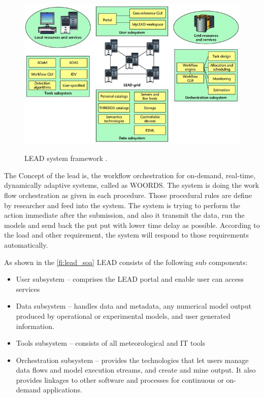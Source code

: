 \begin{figure}[htp]
    \centering
    \includegraphics[width=1.0\textwidth]{lead/LEAD-system-framework-LEAD-is-composed-of-several-interacting-subsystems-with-the-LEAD_W640.jpg}\\
    \caption[LEAD system framework]{LEAD system framework \cite{Droegemeier2005Service-OrientedWeather}.}
    \label{fi:lead_framework}
\end{figure}

The Concept of the \acrshort{lead} is, the workflow orchestration for on-demand, real-time, dynamically adaptive systems, called as WOORDS. The system is doing the work flow orchestration as given in each procedure. Those procedural rules are define by researcher and feed into the system. The system is trying to perform the action immediate after the submission, and also it transmit the data, run the models and send back the put put with lower time delay as possible. According to the load and other requirement, the system will respond to those requirements automatically.

As shown in the \ref{fi:lead_soa} LEAD consists of the following sub components:
\begin{itemize}
\item User subsystem -- comprises the LEAD portal and enable user can access services
\item Data subsystem -- handles data and metadata, any numerical model output produced by operational or experimental models, and user generated information.
\item Tools subsystem -- consists of all meteorological and IT tools
\item Orchestration subsystem -- provides the technologies that let users manage data flows and model execution streams, and create and mine output. It also provides linkages to other software and processes for continuous or on-demand applications. 
\end{itemize}

